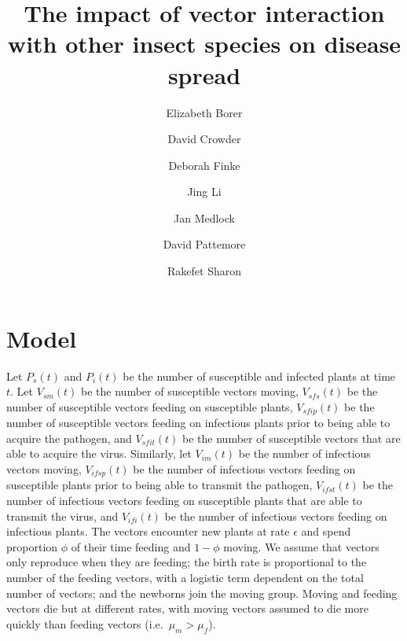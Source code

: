 \documentclass{article}
\title{The impact of vector interaction with other insect species on
  disease spread}
\author{
  Elizabeth Borer
  \and
  David Crowder
  \and
  Deborah Finke
  \and
  Jing Li
  \and
  Jan Medlock
  \and
  David Pattemore
  \and
  Rakefet Sharon
}
\begin{document}
\maketitle

\section{Model}

Let $P_s(t)$ and $P_i(t)$ be the number of susceptible and infected
plants at time $t$.  Let $V_{sm}(t)$ be the number of susceptible
vectors moving, $V_{sfs}(t)$ be the number of susceptible vectors
feeding on susceptible plants, $V_{sfip}(t)$ be the number of
susceptible vectors feeding on infectious plants prior to being able
to acquire the pathogen, and $V_{sfit}(t)$ be the number of
susceptible vectors that are able to acquire the virus.  Similarly,
let $V_{im}(t)$ be the number of infectious vectors moving,
$V_{ifsp}(t)$ be the number of infectious vectors feeding on
susceptible plants prior to being able to transmit the pathogen,
$V_{ifst}(t)$ be the number of infectious vectors feeding on
susceptible plants that are able to transmit the virus, and
$V_{ifi}(t)$ be the number of infectious vectors feeding on infectious
plants.  The vectors encounter new plants at rate $\epsilon$ and spend
proportion $\phi$ of their time feeding and $1 - \phi$ moving.  We
assume that vectors only reproduce when they are feeding; the birth
rate is proportional to the number of the feeding vectors, with a
logistic term dependent on the total number of vectors; and the
newborns join the moving group.  Moving and feeding vectors die but at
different rates, with moving vectors assumed to die more quickly than
feeding vectors (i.e.~$\mu_m > \mu_f$).
\end{document}

